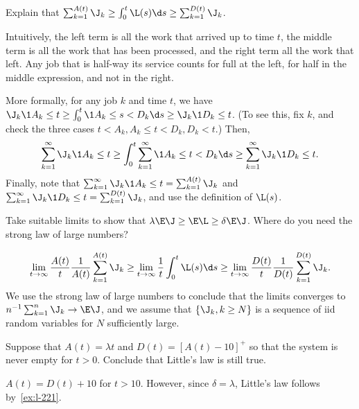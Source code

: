 \begin{exercise}\label{ex:l-220}
Explain that $\sum_{k=1}^{A(t)} \J_k \geq \int_0^t \L(s) \d s \geq \sum_{k=1}^{D(t)} \J_k$.
\begin{solution}
 Intuitively, the left term is all the work that arrived up to time $t$, the middle term is all the work that has been processed, and the right term all the work that left.
 Any job that is half-way its service counts for full at the left, for half in the middle expression, and not in the right.

 More formally, for any job $k$ and time $t$, we have $\J_k \1{A_k \leq t} \geq \int_0^t \1{A_k \leq s < D_k } \d s \geq \J_k \1{D_k \leq t}$. (To see this, fix $k$, and check the three cases $t < A_k, A_k \leq t < D_k, D_k < t$.) Then,
 \begin{equation*}
 \sum_{k=1}^\infty \J_k \1{A_k \leq t} \geq \int_0^t \sum_{k=1}^\infty \1{A_k \leq t < D_k} \d s \geq \sum_{k=1}^\infty \J_k \1{D_k \leq t}.
 \end{equation*}
 Finally, note that $ \sum_{k=1}^\infty \J_k \1{A_k \leq t} = \sum_{k=1}^{A(t)} \J_k$ and $ \sum_{k=1}^\infty \J_k \1{D_k \leq t} = \sum_{k=1}^{D(t)} \J_k$, and use the definition of $\L(s)$.
\end{solution}
\end{exercise}

\begin{exercise}\label{ex:l-221}
Take suitable limits to show that
$\lambda \E\J \geq \E \L \geq \delta \E\J$.
 Where do you need the strong law of large numbers?
\begin{solution}
 \begin{equation*}
 \lim_{t\to\infty} \frac{A(t)}{t}\frac 1{A(t)}\sum_{k=1}^{A(t)} \J_k \geq \lim_{t\to \infty} \frac 1 t \int_0^t \L(s) \d s \geq \lim_{t\to\infty} \frac{D(t)}{t}\frac 1{D(t)} \sum_{k=1}^{D(t)} \J_k.
 \end{equation*}
 We use the strong law of large numbers to conclude that the limits converges to $n^{-1} \sum_{k=1}^n \J_k \to \E \J$, and we assume that $\{\J_k, k\geq N\}$ is a sequence of iid random variables for $N$ sufficiently large.
\end{solution}
\end{exercise}


\begin{exercise}\label{ex:l-222}
 Suppose that $A(t) = \lambda t$ and $D(t)= {[A(t) - 10]}^+$ so that the system is never empty for $t>0$.
Conclude that   Little's law is still true.
\begin{solution}
$A(t) = D(t) + 10$ for $t>10$.  However, since $\delta=\lambda$,  Little's law follows by~\cref{ex:l-221}.
\end{solution}
\end{exercise}





